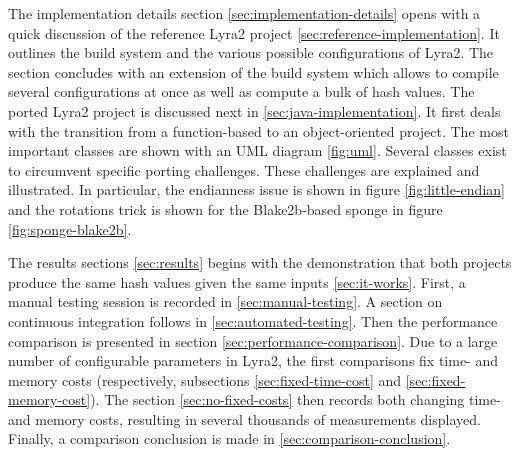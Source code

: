 The implementation details section \ref{sec:implementation-details} opens with a quick discussion of the reference Lyra2 project \ref{sec:reference-implementation}. It outlines the build system and the various possible configurations of Lyra2. The section concludes with an extension of the build system which allows to compile several configurations at once as well as compute a bulk of hash values. The ported Lyra2 project is discussed next in \ref{sec:java-implementation}. It first deals with the transition from a function-based to an object-oriented project. The most important classes are shown with an UML diagram \ref{fig:uml}. Several classes exist to circumvent specific porting challenges. These challenges are explained and illustrated. In particular, the endianness issue is shown in figure \ref{fig:little-endian} and the rotations trick is shown for the Blake2b-based sponge in figure \ref{fig:sponge-blake2b}.

The results sections \ref{sec:results} begins with the demonstration that both projects produce the same hash values given the same inputs \ref{sec:it-works}. First, a manual testing session is recorded in \ref{sec:manual-testing}. A section on continuous integration follows in \ref{sec:automated-testing}. Then the performance comparison is presented in section \ref{sec:performance-comparison}. Due to a large number of configurable parameters in Lyra2, the first comparisons fix time- and memory costs (respectively, subsections \ref{sec:fixed-time-cost} and \ref{sec:fixed-memory-cost}). The section \ref{sec:no-fixed-costs} then records both changing time- and memory costs, resulting in several thousands of measurements displayed. Finally, a comparison conclusion is made in \ref{sec:comparison-conclusion}.
